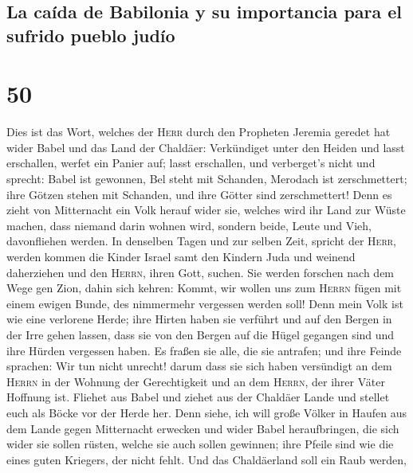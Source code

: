 \hypertarget{la-cauxedda-de-babilonia-y-su-importancia-para-el-sufrido-pueblo-juduxedo}{%
\subsection{La caída de Babilonia y su importancia para el sufrido
pueblo
judío}\label{la-cauxedda-de-babilonia-y-su-importancia-para-el-sufrido-pueblo-juduxedo}}

\hypertarget{section-49}{%
\section{50}\label{section-49}}

 Dies ist das Wort, welches der \textsc{Herr} durch den
Propheten Jeremia geredet hat wider Babel und das Land der Chaldäer:
 Verkündiget unter den Heiden und lasst erschallen, werfet
ein Panier auf; lasst erschallen, und verberget's nicht und sprecht:
Babel ist gewonnen, Bel steht mit Schanden, Merodach ist zerschmettert;
ihre Götzen stehen mit Schanden, und ihre Götter sind zerschmettert!
 Denn es zieht von Mitternacht ein Volk herauf wider sie,
welches wird ihr Land zur Wüste machen, dass niemand darin wohnen wird,
sondern beide, Leute und Vieh, davonfliehen werden.  In
denselben Tagen und zur selben Zeit, spricht der \textsc{Herr}, werden
kommen die Kinder Israel samt den Kindern Juda und weinend daherziehen
und den \textsc{Herrn}, ihren Gott, suchen.  Sie werden
forschen nach dem Wege gen Zion, dahin sich kehren: Kommt, wir wollen
uns zum \textsc{Herrn} fügen mit einem ewigen Bunde, des nimmermehr
vergessen werden soll!  Denn mein Volk ist wie eine
verlorene Herde; ihre Hirten haben sie verführt und auf den Bergen in
der Irre gehen lassen, dass sie von den Bergen auf die Hügel gegangen
sind und ihre Hürden vergessen haben.  Es fraßen sie alle,
die sie antrafen; und ihre Feinde sprachen: Wir tun nicht unrecht! darum
dass sie sich haben versündigt an dem \textsc{Herrn} in der Wohnung der
Gerechtigkeit und an dem \textsc{Herrn}, der ihrer Väter Hoffnung ist.
 Fliehet aus Babel und ziehet aus der Chaldäer Lande und
stellet euch als Böcke vor der Herde her.  Denn siehe, ich
will große Völker in Haufen aus dem Lande gegen Mitternacht erwecken und
wider Babel heraufbringen, die sich wider sie sollen rüsten, welche sie
auch sollen gewinnen; ihre Pfeile sind wie die eines guten Kriegers, der
nicht fehlt.  Und das Chaldäerland soll ein Raub werden,
